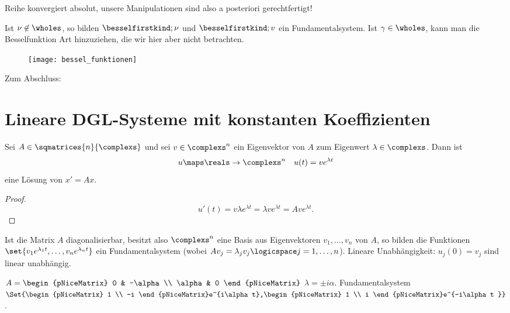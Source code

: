 Reihe konvergiert absolut, unsere Manipulationen sind also a posteriori gerechtfertigt!

Ist \( \nu\not\in \wholes \), so bilden \( \besselfirstkind;{\nu} \) und \( \besselfirstkind;{v} \) ein Fundamentalsystem. Ist \( \gamma\in \wholes \), kann man \zb die Besselfunktion  Art hinzuziehen, die wir hier aber nicht betrachten.
\begin{figure}[H]
  \centering
  \texttt{[image: bessel\_funktionen]}
  \label{fig:bessel_funktionen}
\end{figure}
Zum Abschluss:
\section{Lineare DGL-Systeme mit konstanten Koeffizienten}
\begin{lemma}\label{eigenwert_von_konstanter_matrix_dgl_liefert_exp_loesung}
  Sei \( A\in \sqmatrices{n}{\complexs} \) und sei \( v\in \complexs^n \) ein Eigenvektor von \( A \) zum Eigenwert \( \lambda\in \complexs \). Dann ist
  \begin{equation*}
    u\maps \reals\to \complexs^n\quad u(t)=ve^{\lambda t}
  \end{equation*}
  eine Lösung von \( x'=Ax \).
\end{lemma}
\begin{proof}
  \begin{equation*}
    u'(t)=v\lambda e^{\lambda t}=\lambda v e^{\lambda t}=A v e^{\lambda t}.
  \end{equation*}
  
\end{proof}
\begin{folgerung*}
  Ist die Matrix \( A \) diagonalisierbar, besitzt also \( \complexs^n \) eine Basis aus Eigenvektoren \( v_1,\dotsc,v_n \) von \( A \), so bilden die Funktionen \( \set{v_1 e^{\lambda_1 t},\dotsc, v_n e^{\lambda_n t}} \) ein Fundamentalsystem (wobei \( Av_j=\lambda_j v_j \logicspace j=1,\dotsc,n\)). Lineare Unabhängigkeit: \( u_j(0)=v_j \) sind linear unabhängig.
\end{folgerung*}
\begin{beispiel*}
  \( A=\begin{pNiceMatrix} 0 & -\alpha \\ \alpha & 0 \end{pNiceMatrix} \) \timplies \( \lambda=\pm i\alpha \). Fundamentalsystem \( \Set{\begin{pNiceMatrix} 1 \\ -i \end{pNiceMatrix}e^{i\alpha t},\begin{pNiceMatrix} 1 \\ i \end{pNiceMatrix}e^{-i\alpha t }} \).
\end{beispiel*}
